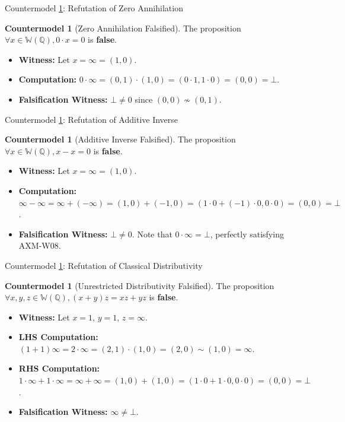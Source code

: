 \documentclass[11pt,a4paper]{article}
\theoremstyle{plain}
\theoremstyle{definition}
\newtheorem{countermodel}[theorem]{Countermodel}
\theoremstyle{remark}
\newcommand{\W}{\mathbb{W}}
\newcommand{\Q}{\mathbb{Q}}
\newcommand{\bott}{\bot}
\newcommand{\inft}{\infty}
\begin{document}
\begin{counterbox}{Countermodel \ref{cm:zero-annihilation}: Refutation of Zero Annihilation}
\begin{countermodel}[Zero Annihilation Falsified]
\label{cm:zero-annihilation}
The proposition $\forall x \in \W(\Q), 0 \cdot x = 0$ is \textbf{false}.
\begin{itemize}
    \item \textbf{Witness:} Let $x = \inft = (1, 0)$.
    \item \textbf{Computation:} $0 \cdot \inft = (0, 1) \cdot (1, 0) = (0 \cdot 1, 1 \cdot 0) = (0, 0) = \bott$.
    \item \textbf{Falsification Witness:} $\bott \neq 0$ since $(0, 0) \not\sim (0, 1)$.
\end{itemize}
\end{countermodel}
\end{counterbox}

\begin{counterbox}{Countermodel \ref{cm:additive-inverse}: Refutation of Additive Inverse}
\begin{countermodel}[Additive Inverse Falsified]
\label{cm:additive-inverse}
The proposition $\forall x \in \W(\Q), x - x = 0$ is \textbf{false}.
\begin{itemize}
    \item \textbf{Witness:} Let $x = \inft = (1, 0)$.
    \item \textbf{Computation:} $\inft - \inft = \inft + (-\inft) = (1, 0) + (-1, 0) = (1\cdot 0 + (-1)\cdot 0, 0\cdot 0) = (0, 0) = \bott$.
    \item \textbf{Falsification Witness:} $\bott \neq 0$. Note that $0 \cdot \inft = \bott$, perfectly satisfying AXM-W08.
\end{itemize}
\end{countermodel}
\end{counterbox}

\begin{counterbox}{Countermodel \ref{cm:unrestricted-distrib}: Refutation of Classical Distributivity}
\begin{countermodel}[Unrestricted Distributivity Falsified]
\label{cm:unrestricted-distrib}
The proposition $\forall x, y, z \in \W(\Q), (x + y)z = xz + yz$ is \textbf{false}.
\begin{itemize}
    \item \textbf{Witness:} Let $x = 1$, $y = 1$, $z = \inft$.
    \item \textbf{LHS Computation:} $(1 + 1)\inft = 2 \cdot \inft = (2, 1) \cdot (1, 0) = (2, 0) \sim (1, 0) = \inft$.
    \item \textbf{RHS Computation:} $1 \cdot \inft + 1 \cdot \inft = \inft + \inft = (1, 0) + (1, 0) = (1\cdot 0 + 1\cdot 0, 0\cdot 0) = (0, 0) = \bott$.
    \item \textbf{Falsification Witness:} $\inft \neq \bott$.
\end{itemize}
\end{countermodel}
\end{counterbox}
\end{document}
